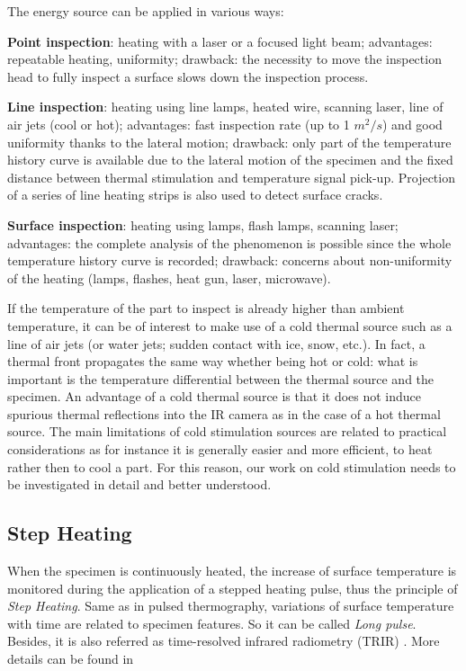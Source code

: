 \noindent The energy source can be applied in various ways:
\begin{description}
	\item \textbf{Point inspection}: heating with a laser or a focused light beam; advantages: repeatable heating, uniformity; drawback: the necessity to move the inspection head to fully inspect a surface slows down the inspection process.
	\item \textbf{Line inspection}: heating using line lamps, heated wire, scanning laser, line of air jets (cool or hot); advantages: fast inspection rate (up to 1 $m^2/s$) and good uniformity thanks to the lateral motion; drawback: only part of the temperature history curve is available due to the lateral motion of the specimen and the fixed distance between thermal stimulation and temperature signal pick-up. Projection of a series of line heating strips is also used to detect surface cracks.
	\item \textbf{Surface inspection}: heating using lamps, flash lamps, scanning laser; advantages: the complete analysis of the phenomenon is possible since the whole temperature history curve is recorded; drawback: concerns about non-uniformity of the heating (lamps, flashes, heat gun, laser, microwave).
\end{description}

If the temperature of the part to inspect is already higher than ambient temperature, it can be of interest to make use of a cold thermal source such as a line of air jets (or water jets; sudden contact with ice, snow, etc.). In fact, a thermal front propagates the same way whether being hot or cold: what is important is the temperature differential between the thermal source and the specimen. An advantage of a cold thermal source is that it does not induce spurious thermal reflections into the IR camera as in the case of a hot thermal source. The main limitations of cold stimulation sources are related to practical considerations as for instance it is generally easier and more efficient, to heat rather then to cool a part. For this reason, our work on cold stimulation needs to be investigated in detail and better understood.

\subsection{Step Heating}
When the specimen is  continuously heated, the increase of surface temperature is monitored during the application of a stepped heating pulse, thus the principle of \textit{Step Heating}. Same as in pulsed thermography, variations of surface temperature with time are related to specimen features. So it can be called \textit{Long pulse}. Besides, it is also referred as  time-resolved  infrared radiometry (TRIR) \citep{spicer1992time}.  More details can be found in \citep{ibarra2013infrared,osiander1998thermal}

